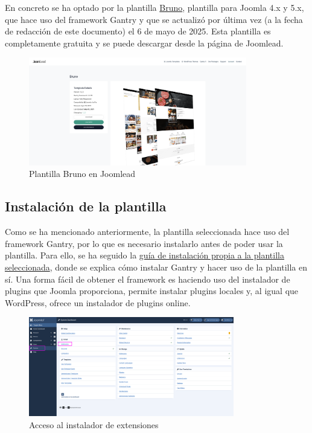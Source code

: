 \documentclass[a4paper]{article}
\begin{document}
En concreto se ha optado por la plantilla \href{https://joomlead.com/joomla-template/bruno/}{Bruno}, plantilla para Joomla 4.x y 5.x, que hace uso del framework Gantry y que se actualizó por última vez (a la fecha de redacción de este documento) el 6 de mayo de 2025. Esta plantilla es completamente gratuita y se puede descargar desde la página de Joomlead.

\begin{figure}[H]
    \centering
    \includegraphics[width=0.85\textwidth]{images/template-details.png}
    \caption{Plantilla Bruno en Joomlead}
\end{figure}

\subsection{Instalación de la plantilla}

Como se ha mencionado anteriormente, la plantilla seleccionada hace uso del framework Gantry, por lo que es necesario instalarlo antes de poder usar la plantilla. Para ello, se ha seguido la \href{https://joomlead.com/documentation/bruno-documentation/}{guía de instalación propia a la plantilla seleccionada}, donde se explica cómo instalar Gantry y hacer uso de la plantilla en sí. Una forma fácil de obtener el framework es haciendo uso del instalador de plugins que Joomla proporciona, permite instalar plugins locales y, al igual que WordPress, ofrece un instalador de plugins online.

\begin{figure}[H]
    \centering
    \includegraphics[width=0.8\textwidth]{images/gantry5-install-1.png}
    \caption{Acceso al instalador de extensiones}
\end{figure}
\end{document}
